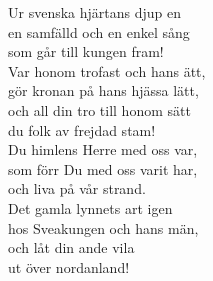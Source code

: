 Ur svenska hjärtans djup en\\
en samfälld och en enkel sång\\
som går till kungen fram!\\
Var honom trofast och hans ätt,\\
gör kronan på hans hjässa lätt,\\
och all din tro till honom sätt\\
du folk av frejdad stam!\\

Du himlens Herre med oss var,\\
som förr Du med oss varit har,\\
och liva på vår strand.\\
Det gamla lynnets art igen\\
hos Sveakungen och hans män,\\
och låt din ande vila\\
ut över nordanland!\\
